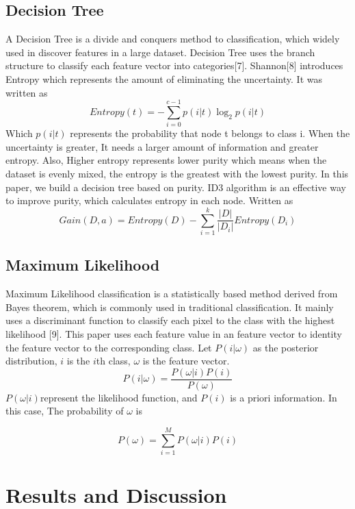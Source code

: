 \documentclass[runningheads]{llncs}
\begin{document}
\subsection{Decision Tree}
A Decision Tree is a divide and conquers method to classification, which widely used in discover features in a large dataset. Decision Tree uses the branch structure to classify each feature vector into categories[7]. Shannon[8] introduces Entropy which represents the amount of eliminating the uncertainty. It was written as
\begin{equation}
	Entropy(t)=-\sum_{i=0}^{c-1}p(i|t)\log_2p(i|t)
\end{equation}
Which $p(i|t)$ represents the probability that node t belongs to class i. When the uncertainty is greater, It needs a larger amount of information and greater entropy. Also, Higher entropy represents lower purity which means when the dataset is evenly mixed, the entropy is the greatest with the lowest purity. In this paper, we build a decision tree based on purity. ID3 algorithm is an effective way to improve purity, which calculates entropy in each node. Written as
\begin{equation}
	Gain(D,a)=Entropy(D)-\sum_{i=1}^{k}\frac{|D|}{|D_i|}Entropy(D_i)
\end{equation}



\subsection{Maximum Likelihood}
Maximum Likelihood classification is a statistically based method derived from Bayes theorem, which is commonly used in traditional classification. It mainly uses a discriminant function to classify each pixel to the class with the highest likelihood [9]. This paper uses each feature value in an feature vector to identity the feature vector to the corresponding class. Let $P(i|\omega)$ as the posterior distribution, $i$ is the $i$th class, $\omega$ is the feature vector.
\begin{equation}
	P(i|\omega)=\frac{P(\omega|i)P(i)}{P(\omega)}
\end{equation}
$P(\omega|i)$represent the likelihood function, and $P(i)$ is a priori information. In this case, The probability of $\omega$ is

\begin{equation}
	P(\omega)=\sum_{i=1}^{M}P(\omega|i)P(i)
\end{equation}


\section{Results and Discussion}
\end{document}
